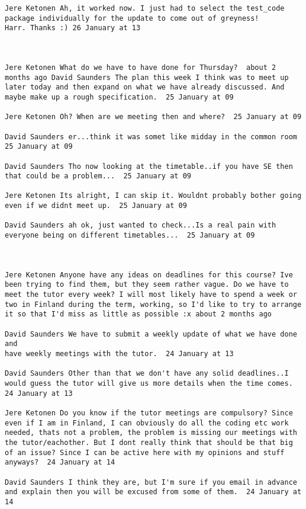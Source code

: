 \begin{verbatim}
Jere Ketonen Ah, it worked now. I just had to select the test_code
package individually for the update to come out of greyness!
Harr. Thanks :) 26 January at 13



Jere Ketonen What do we have to have done for Thursday?  about 2
months ago David Saunders The plan this week I think was to meet up
later today and then expand on what we have already discussed. And
maybe make up a rough specification.  25 January at 09

Jere Ketonen Oh? When are we meeting then and where?  25 January at 09

David Saunders er...think it was somet like midday in the common room
25 January at 09

David Saunders Tho now looking at the timetable..if you have SE then
that could be a problem...  25 January at 09

Jere Ketonen Its alright, I can skip it. Wouldnt probably bother going
even if we didnt meet up.  25 January at 09

David Saunders ah ok, just wanted to check...Is a real pain with
everyone being on different timetables...  25 January at 09



Jere Ketonen Anyone have any ideas on deadlines for this course? Ive
been trying to find them, but they seem rather vague. Do we have to
meet the tutor every week? I will most likely have to spend a week or
two in Finland during the term, working, so I'd like to try to arrange
it so that I'd miss as little as possible :x about 2 months ago 

David Saunders We have to submit a weekly update of what we have done and
have weekly meetings with the tutor.  24 January at 13

David Saunders Other than that we don't have any solid deadlines..I
would guess the tutor will give us more details when the time comes.
24 January at 13

Jere Ketonen Do you know if the tutor meetings are compulsory? Since
even if I am in Finland, I can obviously do all the coding etc work
needed, thats not a problem, the problem is missing our meetings with
the tutor/eachother. But I dont really think that should be that big
of an issue? Since I can be active here with my opinions and stuff
anyways?  24 January at 14

David Saunders I think they are, but I'm sure if you email in advance
and explain then you will be excused from some of them.  24 January at
14




\end{verbatim}
